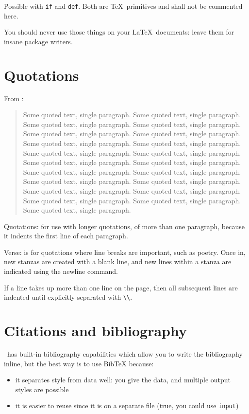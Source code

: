 \documentclass[12pt]{article}
\begin{document}
  Possible with \lstinline|if| and \lstinline|def|. Both are \TeX\ primitives and shall not be commented here.

  You should never use those things on your \LaTeX\ documents: leave them for insane package writers.

\section{Quotations}\label{quotations}

  From \cite{Aa00}:

  \begin{quote}
    Some quoted text, single paragraph. Some quoted text, single paragraph. Some quoted text, single paragraph.
    Some quoted text, single paragraph. Some quoted text, single paragraph. Some quoted text, single paragraph.
    Some quoted text, single paragraph. Some quoted text, single paragraph. Some quoted text, single paragraph.
    Some quoted text, single paragraph. Some quoted text, single paragraph. Some quoted text, single paragraph.
    Some quoted text, single paragraph. Some quoted text, single paragraph. Some quoted text, single paragraph.
    Some quoted text, single paragraph. Some quoted text, single paragraph. Some quoted text, single paragraph.
    Some quoted text, single paragraph. Some quoted text, single paragraph. Some quoted text, single paragraph.
  \end{quote}

  Quotations: for use with longer quotations, of more than one paragraph, because it indents the first line of each paragraph.

  Verse: is for quotations where line breaks are important, such as poetry. Once in, new stanzas are created with a blank line, and new lines within a stanza are indicated using the newline command.

  If a line takes up more than one line on the page, then all subsequent lines are indented until explicitly separated with \lstinline|\\|.

\section{Citations and bibliography}\label{secCit}

  \LateX\ has built-in bibliography capabilities which allow you to write the bibliography inline, but the best way is to use BibTeX because:

  \begin{itemize}
    \item it separates style from data well: you give the data, and multiple output styles are possible
    \item it is easier to reuse since it is on a separate file (true, you could use \lstinline|input|)
  \end{itemize}
\end{document}

